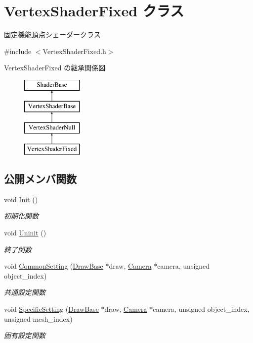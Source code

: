 \hypertarget{class_vertex_shader_fixed}{}\section{Vertex\+Shader\+Fixed クラス}
\label{class_vertex_shader_fixed}


固定機能頂点シェーダークラス  




{\ttfamily \#include $<$Vertex\+Shader\+Fixed.\+h$>$}

Vertex\+Shader\+Fixed の継承関係図\begin{figure}[H]
\begin{center}
\leavevmode
\includegraphics[height=4.000000cm]{class_vertex_shader_fixed}
\end{center}
\end{figure}
\subsection*{公開メンバ関数}
\begin{DoxyCompactItemize}
\item 
void \mbox{\hyperlink{class_vertex_shader_fixed_ae829ff736b33c45543804059255125b6}{Init}} ()
\begin{DoxyCompactList}\small\item\em 初期化関数 \end{DoxyCompactList}\item 
void \mbox{\hyperlink{class_vertex_shader_fixed_a49f630aee4757c8fd8bae886f22dfeb0}{Uninit}} ()
\begin{DoxyCompactList}\small\item\em 終了関数 \end{DoxyCompactList}\item 
void \mbox{\hyperlink{class_vertex_shader_fixed_a82bf2829b6fd0df26faedcbf650ba08d}{Common\+Setting}} (\mbox{\hyperlink{class_draw_base}{Draw\+Base}} $\ast$draw, \mbox{\hyperlink{class_camera}{Camera}} $\ast$camera, unsigned object\+\_\+index)
\begin{DoxyCompactList}\small\item\em 共通設定関数 \end{DoxyCompactList}\item 
void \mbox{\hyperlink{class_vertex_shader_fixed_a87523c320f6f6767d59d7b24265db7ec}{Specific\+Setting}} (\mbox{\hyperlink{class_draw_base}{Draw\+Base}} $\ast$draw, \mbox{\hyperlink{class_camera}{Camera}} $\ast$camera, unsigned object\+\_\+index, unsigned mesh\+\_\+index)
\begin{DoxyCompactList}\small\item\em 固有設定関数 \end{DoxyCompactList}\end{DoxyCompactItemize}


